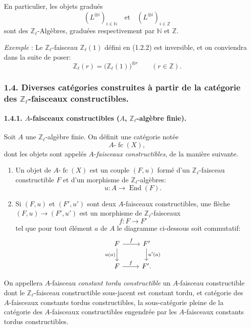 \documentclass[11pt]{article}
\providecommand{\End}{\operatorname{End}}
\providecommand{\End}{\operatorname{End}}
\providecommand{\fc}{\operatorname{fc}}
\begin{document}
En particulier, les objets gradués
\[
(L^{\otimes i})_{i\in\mathbb N}\quad\text{et}\quad(L^{\otimes i})_{i\in\mathbb Z}
\]
sont des \(\mathbb Z_\ell\)-Algèbres, graduées respectivement par \(\mathbb N\) et \(\mathbb Z\).

\emph{Exemple} : Le \(\mathbb Z_\ell\)-faisceau \(\mathbb Z_\ell(1)\) défini en (1.2.2) est inversible, et on conviendra dans la suite de poser:
\[
\mathbb Z_\ell(r)=\bigl(\mathbb Z_\ell(1)\bigr)^{\otimes r}\qquad (r\in\mathbb Z).
\]

\subsubsection*{1.4. Diverses catégories construites à partir de la catégorie des \(\mathbb Z_\ell\)-faisceaux constructibles.}

\paragraph{1.4.1. \(A\)-faisceaux constructibles (\(A\), \(\mathbb Z_\ell\)-algèbre finie).}
Soit \(A\) une \(\mathbb Z_\ell\)-algèbre finie. On définit une catégorie notée
\[
A\text{-}\fc(X),
\]
dont les objets sont appelés \(A\)-\emph{faisceaux constructibles}, de la manière suivante.

\begin{enumerate}[label=(\roman*)]
\item Un objet de \(A\text{-}\fc(X)\) est un couple \((F,u)\) formé d'un \(\mathbb Z_\ell\)-faisceau constructible \(F\) et d'un morphisme de \(\mathbb Z_\ell\)-algèbres:
\[
u:A\longrightarrow \End(F).
\]
\item Si \((F,u)\) et \((F',u')\) sont deux \(A\)-faisceaux constructibles, une flèche \((F,u)\to(F',u')\) est un morphisme de \(\mathbb Z_\ell\)-faisceaux
\[
f:F\longrightarrow F'
\]
tel que pour tout élément \(a\) de \(A\) le diagramme ci-dessous soit commutatif:
\[
\begin{tikzcd}
F \arrow[r,"f"] \arrow[d,"u(a)"'] & F' \arrow[d,"u'(a)"]\\
F \arrow[r,"f"] & F'.
\end{tikzcd}
\]
\end{enumerate}

On
appellera \(A\)-faisceau \emph{constant tordu constructible} un \(A\)-faisceau constructible dont le \(\mathbb Z_\ell\)-faisceau constructible sous-jacent est constant tordu, et catégorie des \(A\)-faisceaux constants tordus constructibles, la sous-catégorie pleine de la catégorie des \(A\)-faisceaux constructibles engendrée par les \(A\)-faisceaux constants tordus constructibles.
\end{document}
